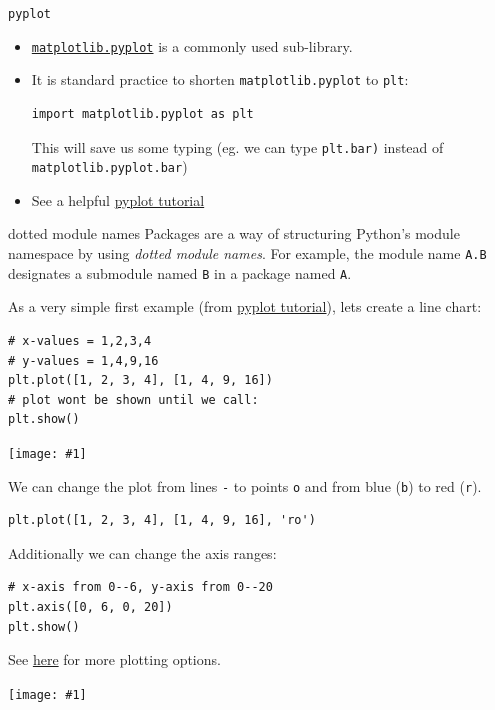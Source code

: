 \documentclass[xcolor=svgnames, handout]{beamer}
\newcommand{\nl}{\\[1em]}
\newcommand{\ipic}[2]{\texttt{[image: \#1]}}
\begin{document}
\begin{frame}[fragile]{\tt pyplot}
\begin{itemize}
\item \href{https://matplotlib.org/api/pyplot_api.html}{\tt matplotlib.pyplot} is a commonly used sub-library.\nl
\item It is  standard practice  to shorten {\tt matplotlib.pyplot} to {\tt plt}:
\begin{Verbatim}[frame=single]
import matplotlib.pyplot as plt
\end{Verbatim}
This will save us some typing (eg. we can type {\tt plt.bar)}  instead of {\tt matplotlib.pyplot.bar})\nl
\item See a helpful \href{https://matplotlib.org/3.1.0/tutorials/introductory/pyplot.html}{pyplot tutorial}
\end{itemize}
\begin{block}{dotted module names}
Packages are a way of structuring Python's module namespace by using \textit{dotted module names}. For example, the module name {\tt A.B} designates a submodule named {\tt B} in a package named {\tt A}.
\end{block}

\end{frame}

\begin{frame}[fragile]
As a very simple first example (from \href{https://matplotlib.org/3.1.0/tutorials/introductory/pyplot.html}{pyplot tutorial}), lets create a line chart:
\begin{Verbatim}[frame=single]
# x-values = 1,2,3,4
# y-values = 1,4,9,16
plt.plot([1, 2, 3, 4], [1, 4, 9, 16])
# plot wont be shown until we call:
plt.show()
\end{Verbatim}
\begin{center}
\ipic{img/plot1}{0.5}
\end{center}
\end{frame}

\begin{frame}[fragile]
We can change the plot from lines {\tt -} to points {\tt o} and from blue ({\tt b}) to red ({\tt r}).  
\begin{Verbatim}[frame=single]
plt.plot([1, 2, 3, 4], [1, 4, 9, 16], 'ro')
\end{Verbatim}

Additionally we can change the axis ranges:
\begin{Verbatim}[frame=single]
# x-axis from 0--6, y-axis from 0--20
plt.axis([0, 6, 0, 20])
plt.show()
\end{Verbatim}
See \href{https://matplotlib.org/3.1.0/api/_as_gen/matplotlib.pyplot.plot.html#matplotlib.pyplot.plot}{here} for more plotting options.
\begin{center}
\ipic{img/plot2}{0.5}
\end{center}

\end{frame}
\end{document}

